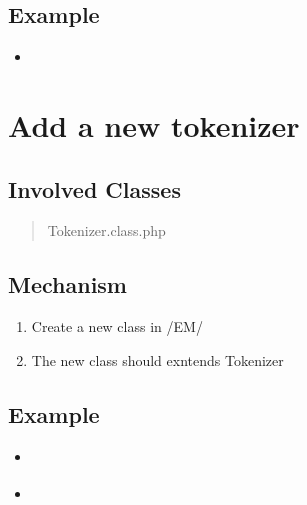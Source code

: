 \documentclass[letterpaper,10pt,english]{sphinxmanual}
\begin{document}
\subsection{Example}
\label{docs/hooks/t_rdf_parser:example}\begin{itemize}
\item {} 
{\hyperref[docs/api:EasyRdfAdapter]{}}

\end{itemize}


\section{Add a new tokenizer}
\label{docs/hooks/t_tokenizer::doc}\label{docs/hooks/t_tokenizer:hook-template-uss}\label{docs/hooks/t_tokenizer:add-a-new-tokenizer}

\subsection{Involved Classes}
\label{docs/hooks/t_tokenizer:involved-classes}\begin{quote}

Tokenizer.class.php
\end{quote}


\subsection{Mechanism}
\label{docs/hooks/t_tokenizer:mechanism}\begin{enumerate}
\item {} 
Create a new class in /EM/

\item {} 
The new class should exntends Tokenizer

\end{enumerate}


\subsection{Example}
\label{docs/hooks/t_tokenizer:example}\begin{itemize}
\item {} 
{\hyperref[docs/api:CaseBasedTokenizer]{}}

\item {} 
{\hyperref[docs/api:DelimitBasedTokenizer]{}}

\end{itemize}
\end{document}
